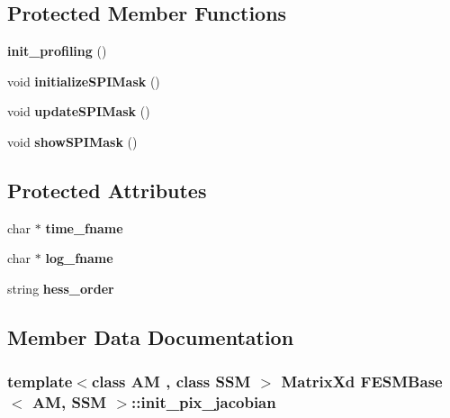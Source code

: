 \subsection*{Protected Member Functions}
\begin{DoxyCompactItemize}
\item 
\hypertarget{classFESMBase_a07512215cb0766f232ec1dd0fa6624a2}{{\bfseries init\-\_\-profiling} ()}\label{classFESMBase_a07512215cb0766f232ec1dd0fa6624a2}

\item 
\hypertarget{classFESMBase_af63d3fae8a50100dd88cdc935bbfed46}{void {\bfseries initialize\-S\-P\-I\-Mask} ()}\label{classFESMBase_af63d3fae8a50100dd88cdc935bbfed46}

\item 
\hypertarget{classFESMBase_aa6c5a95dae5b3aaec9c2109fc07686dd}{void {\bfseries update\-S\-P\-I\-Mask} ()}\label{classFESMBase_aa6c5a95dae5b3aaec9c2109fc07686dd}

\item 
\hypertarget{classFESMBase_af3b8ecbd65a5e067300a2aa4b61d4c38}{void {\bfseries show\-S\-P\-I\-Mask} ()}\label{classFESMBase_af3b8ecbd65a5e067300a2aa4b61d4c38}

\end{DoxyCompactItemize}
\subsection*{Protected Attributes}
\begin{DoxyCompactItemize}
\item 
\hypertarget{classFESMBase_a0f57bb400abbe8f35c0f683e19f96047}{char $\ast$ {\bfseries time\-\_\-fname}}\label{classFESMBase_a0f57bb400abbe8f35c0f683e19f96047}

\item 
\hypertarget{classFESMBase_aa8dead227cd5528f35a6db3485db062d}{char $\ast$ {\bfseries log\-\_\-fname}}\label{classFESMBase_aa8dead227cd5528f35a6db3485db062d}

\item 
\hypertarget{classFESMBase_a4689d0be67145da047e2c32f0cdf303f}{string {\bfseries hess\-\_\-order}}\label{classFESMBase_a4689d0be67145da047e2c32f0cdf303f}

\end{DoxyCompactItemize}


\subsection{Member Data Documentation}
\hypertarget{classFESMBase_a34b1dddc4fb6e3f4187e0388cb8684f2}{
\subsubsection[{init\-\_\-pix\-\_\-jacobian}]{\setlength{\rightskip}{0pt plus 5cm}template$<$class A\-M , class S\-S\-M $>$ Matrix\-Xd {\bf F\-E\-S\-M\-Base}$<$ A\-M, S\-S\-M $>$\-::init\-\_\-pix\-\_\-jacobian}}\label{classFESMBase_a34b1dddc4fb6e3f4187e0388cb8684f2}


